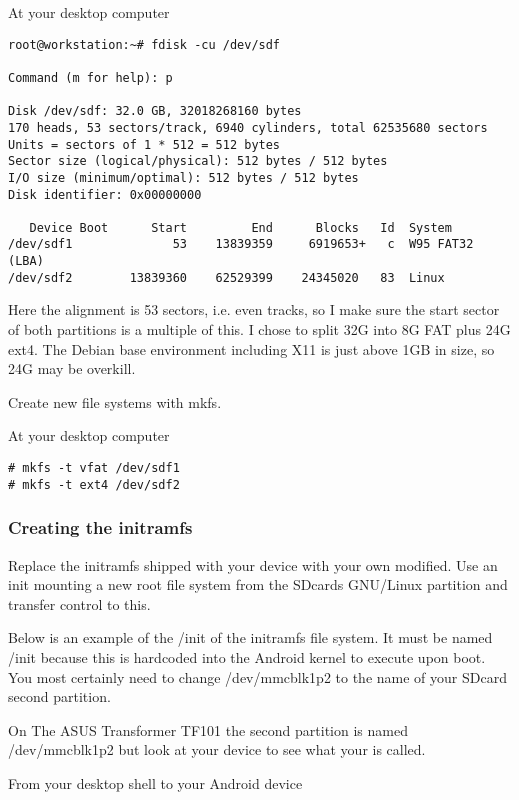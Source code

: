 At your desktop computer

\begin{verbatim}
root@workstation:~# fdisk -cu /dev/sdf

Command (m for help): p

Disk /dev/sdf: 32.0 GB, 32018268160 bytes
170 heads, 53 sectors/track, 6940 cylinders, total 62535680 sectors
Units = sectors of 1 * 512 = 512 bytes
Sector size (logical/physical): 512 bytes / 512 bytes
I/O size (minimum/optimal): 512 bytes / 512 bytes
Disk identifier: 0x00000000

   Device Boot      Start         End      Blocks   Id  System
/dev/sdf1              53    13839359     6919653+   c  W95 FAT32 (LBA)
/dev/sdf2        13839360    62529399    24345020   83  Linux
\end{verbatim}

Here the alignment is 53 sectors, i.e. even tracks, so I make sure the start
sector of both partitions is a multiple of this. I chose to split 32G into 8G
FAT plus 24G ext4. The Debian base environment including X11 is just above 1GB
in size, so 24G may be overkill.

Create new file systems with mkfs.

At your desktop computer

\begin{verbatim}
# mkfs -t vfat /dev/sdf1
# mkfs -t ext4 /dev/sdf2
\end{verbatim}

\subsubsection{Creating the initramfs}

Replace the initramfs shipped with your device with your own modified. Use an
init mounting a new root file system from the SDcards GNU/Linux partition and
transfer control to this.

Below is an example of the /init of the initramfs file system. It must be named
/init because this is hardcoded into the Android kernel to execute upon boot.
You most certainly need to change /dev/mmcblk1p2 to the name of your SDcard
second partition.

On The ASUS Transformer TF101 the second partition is named /dev/mmcblk1p2 but
look at your device to see what your is called.

From your desktop shell to your Android device

